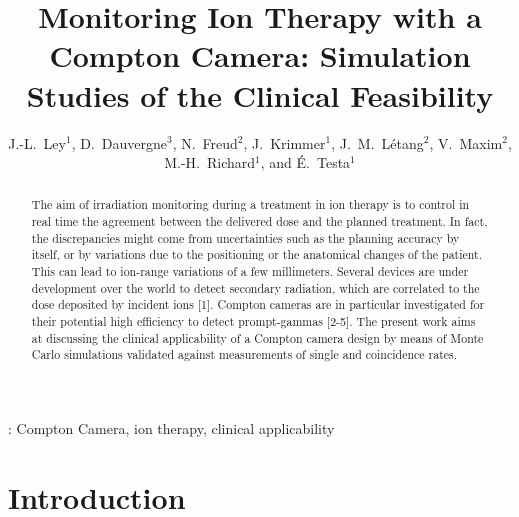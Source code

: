 \documentclass[12pt]{iopart}
\begin{document}
\title{Monitoring Ion Therapy with a Compton Camera: Simulation Studies of the Clinical Feasibility}

\author{J.-L.~Ley$^1$, D.~Dauvergne$^3$, N.~Freud$^2$, J.~Krimmer$^1$, J.~M.~Létang$^2$, V.~Maxim$^2$, M.-H.~Richard$^1$, and \'E.~Testa$^1$}

\address{$^1$Univ Lyon, Université Claude Bernard Lyon 1, CNRS/IN2P3, Institut de Physique Nucléaire de Lyon, 69622 Villeurbanne, France}
\address{$^2$Univ Lyon, INSA-Lyon, Université Claude Bernard Lyon 1, UJM-Saint Étienne, CNRS, Inserm, Centre Léon Bérard, CREATIS UMR 5220 U1206, F-69373, Lyon, France}
\address{$^3$LPSC, Université Grenoble-Alpes, CNRS/IN2P3 UMR5821, F-38026 Grenoble, France}

\begin{abstract}
The aim of irradiation monitoring during a treatment in ion therapy is to control in real time the agreement between the delivered dose and the planned treatment. In fact, the discrepancies might come from uncertainties such as the planning accuracy by itself, or by variations due to the positioning or the anatomical changes of the patient. This can lead to ion-range variations of a few millimeters. Several devices are under development over the world to detect secondary radiation, which are correlated to the dose deposited by incident ions [1]. Compton cameras are in particular investigated for their potential high efficiency to detect prompt-gammas [2-5]. The present work aims at discussing the clinical applicability of a Compton camera design by means of Monte Carlo simulations validated against measurements of single and coincidence rates.

\end{abstract}


\submitto{\PMB}
\vspace{2pc}
: Compton Camera, ion therapy, clinical applicability
\maketitle
%
\newpage

\tableofcontents


\section{Introduction}
\end{document}
